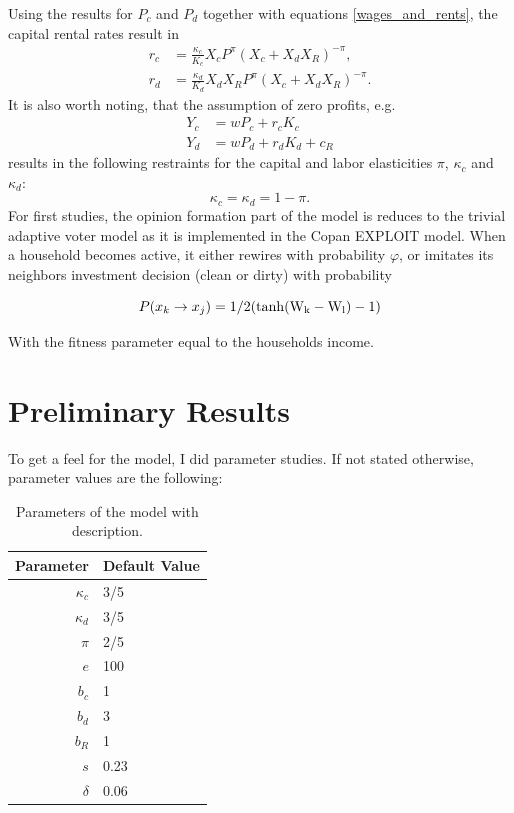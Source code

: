 Using the results for $P_c$ and $P_d$ together with equations \eqref{wages_and_rents}, the capital rental rates result in
\begin{align}
	r_c &= \frac{\kappa_c}{K_c}X_c P^{\pi}\left( X_c + X_d X_R \right)^{-\pi}, \label{r_c_result}\\
	r_d &= \frac{\kappa_d}{K_d}X_d X_R P^{\pi}\left( X_c + X_d X_R \right)^{-\pi}. \label{r_d_result}
\end{align}
It is also worth noting, that the assumption of zero profits, e.g.
\begin{align}
	Y_c &= w P_c + r_c K_c \nonumber \\
	Y_d &= w P_d + r_d K_d + c_R \nonumber
\end{align}
results in the following restraints for the capital and labor elasticities $\pi$, $\kappa_c$ and $\kappa_d$:
\begin{equation}
	\kappa_c = \kappa_d = 1-\pi.
	\label{elasticities_restriction}
\end{equation}
For first studies, the opinion formation part of the model is reduces to the trivial adaptive voter model as it is implemented in the Copan EXPLOIT model. When a household becomes active, it either rewires with probability $\varphi$, or imitates its neighbors investment decision (clean or dirty) with probability 

\begin{equation}
	P(x_k \rightarrow x_j) = 1/2 (\rm{tanh}(W_k - W_l)-1)
	\label{primitive_imitation_probability}
\end{equation}

With the fitness parameter equal to the households income.

\section{Preliminary Results}

To get a feel for the model, I did parameter studies. 
If not stated otherwise, parameter values are the following:
\begin{table}[H]
	\centering
	\begin{tabular}{r|l}
		Parameter & Default Value \\\hline
		$\kappa_c$ & 3/5 \\
		$\kappa_d$ & 3/5 \\
		$\pi$ & 2/5 \\
		$e$ & 100 \\
		$b_c$ & 1 \\
		$b_d$ & 3 \\
		$b_R$ & 1 \\
		$s$ & 0.23 \\
		$\delta $ & 0.06 \\
	\end{tabular}
	\caption{Parameters of the model with description.}
	\label{tab:parameter_values}
\end{table}

